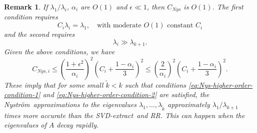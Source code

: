 \documentclass[onefignum,onetabnum]{siamart251216}
\def\Nystrom{Nystr{\"o}m}
\def\svdmethod{SVD-extract}
\newtheorem{remark}{{\sc Remark}}[section]
\begin{document}
\begin{remark}
    \label{remark:Higher-order-of-Nystrom}
    If $\lambda_1 / \lambda_i$, $\alpha_i$ are $O(1)$ and $\epsilon \ll 1$, then $C_{Nys}$ is $O(1)$. The first condition requires
    \begin{equation}
        \label{eq:Nys-higher-order-condition-1}
        C_i \lambda_i = \lambda_1, \quad \text{with moderate $O(1)$ constant } C_i
    \end{equation}
    and the second requires
    \begin{equation}
        \label{eq:Nys-higher-order-condition-2}
        \lambda_i \gg \lambda_{k+1}.
    \end{equation}
    Given the above conditions, we have
    \[
        C_{Nys,i} \leq \left(\frac{1+\epsilon^2}{\alpha_i}\right)^2 \left(C_i + \frac{1-\alpha_i}{3}\right)^2 \leq \left(\frac{2}{\alpha_i}\right)^2 \left(C_i + \frac{1-\alpha_i}{3}\right)^2.
    \]
    These imply that for some small $\tilde{k} < k$ such that conditions \eqref{eq:Nys-higher-order-condition-1} and \eqref{eq:Nys-higher-order-condition-2} are satisfied, the \Nystrom\ approximations to the eigenvalues $\lambda_1, ..., \lambda_{\tilde{k}}$ approximately $\lambda_{1}/\lambda_{k+1}$ times more accurate than the \svdmethod\ and RR. This can happen when the eigenvalues of $A$ decay rapidly.
\end{remark}
\end{document}
